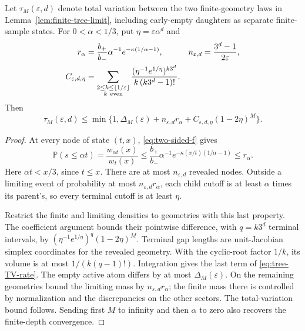 \documentclass[11pt,letterpaper]{article}
\newcommand{\PP}{\mathbb P}\newcommand{\EE}{\mathbb E}
\begin{document}
\begin{corollary}\label{cor:tree-rate}
Let $\tau_M(\varepsilon,d)$ denote total variation between the two
finite-geometry laws in Lemma~\ref{lem:finite-tree-limit}, including
early-empty daughters as separate finite-sample states. For
$0<\alpha<1/3$, put $\eta=\varepsilon\alpha^d$ and
\begin{align*}
 r_\alpha&=\frac{b_+}{b_-}\alpha^{-1}
                         e^{-\kappa(1/\alpha-1)},&
 n_{\varepsilon,d}&=\frac{3^d-1}{2\varepsilon},\\
 C_{\varepsilon,d,\eta}
   &=\sum_{\substack{2\le k\le\lfloor1/\varepsilon\rfloor\\k\ {\rm even}}}
       \frac{(\eta^{-1}e^{1/\eta})^{k3^d}}
                         {k\,(k3^d-1)!}.
\end{align*}
Then
\begin{equation}\label{eq:tree-TV-rate}
 \tau_M(\varepsilon,d)\le
 \min\{1,\Delta_M(\varepsilon)+n_{\varepsilon,d}r_\alpha
            +C_{\varepsilon,d,\eta}(1-2\eta)^M\}.
\end{equation}
\end{corollary}
\begin{proof}
At every node of state $(t,x)$, \eqref{eq:two-sided-f} gives
\[
 \PP(s\le\alpha t)=\frac{w_{\alpha t}(x)}{w_t(x)}
 \le\frac{b_+}{b_-}\alpha^{-1}
          e^{-\kappa(x/t)(1/\alpha-1)}\le r_\alpha.
\]
Here $\alpha t<x/3$, since $t\le x$. There are at most
$n_{\varepsilon,d}$ revealed nodes. Outside a limiting event of
probability at most $n_{\varepsilon,d}r_\alpha$, each child cutoff is
at least $\alpha$ times its parent's, so every terminal cutoff is at
least $\eta$.

Restrict the finite and limiting densities to geometries with this last
property. The coefficient argument bounds their pointwise difference,
with $q=k3^d$ terminal intervals, by
$(\eta^{-1}e^{1/\eta})^q(1-2\eta)^M$.
Terminal gap lengths are unit-Jacobian simplex coordinates for the
revealed geometry. With the cyclic-root factor $1/k$, its volume is at
most $1/(k(q-1)!)$. Integration gives the last term of
\eqref{eq:tree-TV-rate}. The empty active atom differs by at most
$\Delta_M(\varepsilon)$. On the remaining geometries bound the limiting
mass by $n_{\varepsilon,d}r_\alpha$; the finite mass there is controlled
by normalization and the discrepancies on the other sectors.
The total-variation bound follows. Sending first $M$ to infinity and
then $\alpha$ to zero also recovers the finite-depth convergence.
\end{proof}
\end{document}
